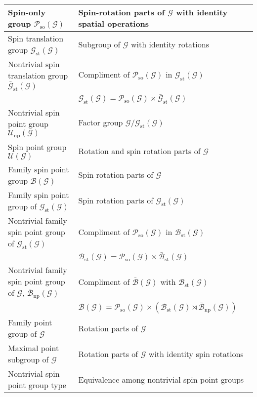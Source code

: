 \begin{table*}[tb]
\begin{tabular}{ll}
        \hline
        Spin-only group $\mathcal{P}_{\mathrm{so}}(\mathcal{G})$ & Spin-rotation parts of $\mathcal{G}$ with identity spatial operations \\
        \hline
        Spin translation group $\mathcal{G}_{\mathrm{st}}(\mathcal{G})$ & Subgroup of $\mathcal{G}$ with identity rotations \\
        Nontrivial spin translation group $\bar{\mathcal{G}}_{\mathrm{st}}(\mathcal{G})$
            & Compliment of $\mathcal{P}_{\mathrm{so}}(\mathcal{G})$ in $\mathcal{G}_{\mathrm{st}}(\mathcal{G})$ \\
            & $\mathcal{G}_{\mathrm{st}}(\mathcal{G}) = \mathcal{P}_{\mathrm{so}}(\mathcal{G}) \times \bar{\mathcal{G}}_{\mathrm{st}}(\mathcal{G})$ \\
        Nontrivial spin point group $\mathcal{U}_{\mathrm{np}}(\mathcal{G})$ & Factor group $\mathcal{G} / \mathcal{G}_{\mathrm{st}}(\mathcal{G})$ \\
        \hline
        Spin point group $\mathcal{U}(\mathcal{G})$ & Rotation and spin rotation parts of $\mathcal{G}$ \\
        Family spin point group $\mathcal{B}(\mathcal{G})$ & Spin rotation parts of $\mathcal{G}$ \\
        Family spin point group of $\mathcal{G}_{\mathrm{st}}(\mathcal{G})$ & Spin rotation parts of $\mathcal{G}_{\mathrm{st}}(\mathcal{G})$ \\
        Nontrivial family spin point group of $\mathcal{G}_{\mathrm{st}}(\mathcal{G})$
            & Compliment of $\mathcal{P}_{\mathrm{so}}(\mathcal{G})$ in $\mathcal{B}_{\mathrm{st}}(\mathcal{G})$ \\
            & $\mathcal{B}_{\mathrm{st}}(\mathcal{G}) = \mathcal{P}_{\mathrm{so}}(\mathcal{G}) \times \bar{\mathcal{B}}_{\mathrm{st}}(\mathcal{G})$ \\
        Nontrivial family spin point group of $\mathcal{G}$, $\bar{\mathcal{B}}_{\mathrm{np}}(\mathcal{G})$
            & Compliment of $\bar{\mathcal{B}}(\mathcal{G})$ with $\mathcal{B}_{\mathrm{st}}(\mathcal{G})$ \\
            & $\mathcal{B}(\mathcal{G}) = \mathcal{P}_{\mathrm{so}}(\mathcal{G}) \times \left( \mathcal{B}_{\mathrm{st}}(\mathcal{G}) \rtimes \bar{\mathcal{B}}_{\mathrm{np}}(\mathcal{G}) \right)$ \\
        Family point group of $\mathcal{G}$ & Rotation parts of $\mathcal{G}$ \\
        Maximal point subgroup of $\mathcal{G}$ & Rotation parts of $\mathcal{G}$ with identity spin rotations \\
        Nontrivial spin point group type & Equivalence among nontrivial spin point groups \\
        \hline\hline
    \end{tabular}
\end{table*}
